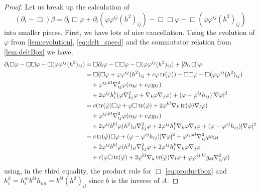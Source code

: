 \documentclass{amsart}
\begin{document}
\begin{proof}
Let us break up the calculation of
\[
(\partial_{t} - \Box)\beta =  \partial_{t}\Box\varphi + \partial_{t} (\varphi\varphi^{ij} (h^2)_{ij}) - \Box\Box\varphi - \Box(\varphi\varphi^{ij} (h^2)_{ij})
\]
into smaller pieces. First, we have lots of nice cancellation. Using the evolution of \(\varphi\) from \cref{lem:evolution}, \cref{eq:delt_speed} and the commutator relation from \cref{lem:deltBox} we have,
\begin{equation}
\label{eq:deltbeta1}
\begin{split}
\partial_{t}\Box\varphi - \Box\Box\varphi - \Box(\varphi\varphi^{ij} (h^2)_{ij}) &= \Box\partial_t\varphi - \Box\Box\varphi - \Box(\varphi\varphi^{ij} (h^2)_{ij}) + [\partial_t, \Box] \varphi \\
&= \Box(\Box \varphi + \varphi\varphi^{ij}(h^2)_{ij} + c \varphi\operatorname{tr}(\dot{\varphi})) - \Box\Box\varphi - \Box(\varphi\varphi^{ij} (h^2)_{ij}) \\
&\quad + \varphi^{ij,kl} \nabla^2_{ij} \varphi (\alpha_{kl} + c \varphi g_{kl}) \\
&\quad + 2\varphi^{ij}h^{k}_{i} (\varphi \nabla^2_{kj} \varphi + \nabla_k \varphi \nabla_j \varphi) + (\varphi - \varphi^{ij}h_{ij})| \nabla\varphi|^{2} \\
&= c (\operatorname{tr}(\dot{\varphi}) \Box \varphi + \varphi \Box \operatorname{tr}(\dot{\varphi}) + 2 \varphi^{kl} \nabla_k \operatorname{tr}(\dot{\varphi}) \nabla_l \varphi) \\
&\quad + \varphi^{ij,kl} \nabla^2_{ij} \varphi (\alpha_{kl} + c \varphi g_{kl}) \\
&\quad + 2\varphi^{ij}b^{kl} \varphi (h^2)_{il} \nabla^2_{kj} \varphi + 2\varphi^{ij}h^{k}_{i} \nabla_k \varphi \nabla_j \varphi + (\varphi - \varphi^{ij}h_{ij})| \nabla\varphi|^{2} \\
&= c \operatorname{tr}(\dot{\varphi}) \Box \varphi + (\varphi - \varphi^{ij}h_{ij})| \nabla\varphi|^{2}  + \varphi^{ij,kl} \nabla^2_{ij} \varphi \alpha_{kl} \\
&\quad + 2\varphi^{ij}b^{kl} \varphi (h^2)_{il} \nabla^2_{kj} \varphi + 2\varphi^{ij}h^{k}_{i} \nabla_k \varphi \nabla_j \varphi \\
&\quad + c(\varphi \Box \operatorname{tr}(\dot{\varphi}) + 2 \varphi^{kl} \nabla_k \operatorname{tr}(\dot{\varphi}) \nabla_l \varphi + \varphi \varphi^{ij,kl} g_{kl} \nabla^2_{ij} \varphi)
\end{split}
\end{equation}
using, in the third equality, the product rule for \(\Box\) \cref{eq:productbox} and \(h^k_i = h^m_i b^{kl}h_{ml} = b^{kl} (h^2)_{il}\) since \(b\) is the inverse of \(A\).


\end{proof}
\end{document}
